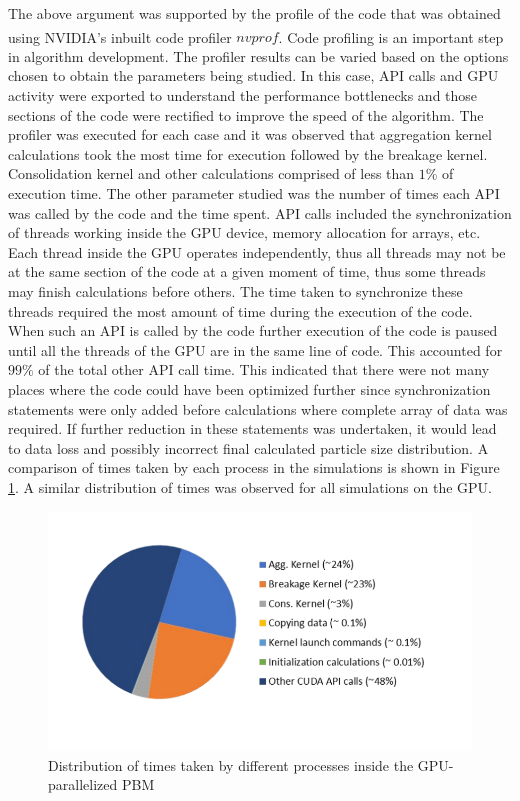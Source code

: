 \documentclass[review]{elsarticle}
\begin{document}
\begin{linenumbers}
The above argument was supported by the profile of the code that was obtained using NVIDIA\textsuperscript{\tiny\textregistered}'s
inbuilt code profiler $nvprof$. Code profiling is an important step in algorithm development. 
The profiler results can be varied based on the options chosen to obtain the parameters being 
studied. In this case, API calls and GPU activity were exported to understand the performance 
bottlenecks and those sections of the code were rectified to improve the speed of the algorithm.
The profiler was executed for each case and it was observed that aggregation kernel calculations 
took the most time for execution followed by the breakage kernel. Consolidation kernel 
and other calculations comprised of less than $1$\% of execution time. The other parameter 
studied was the number of times each API was called by the code and the time spent. API 
calls included the synchronization of threads working inside the GPU device, memory allocation 
for arrays, etc. Each thread inside the GPU operates independently,
thus all threads may not be at the same section of the code at a given moment of time, 
thus some threads may finish calculations before others. The time taken to synchronize 
these threads required the most amount of time during the execution of the code. When 
such an API is called by the code further execution of the code is paused until all 
the threads of the GPU are in the same line of code. This accounted for $99\%$ of the total  
other API call time. This indicated that there were not many places where the code could 
have been optimized further since synchronization statements were only added before 
calculations where complete array of data was required. 
If further reduction in these statements was undertaken, it would lead to data loss and 
possibly incorrect final calculated particle size distribution. A comparison of times taken 
by each process in the simulations is shown in Figure \ref{fig:res_profile_pie}. A similar 
distribution of times was observed for all simulations on the GPU.

\begin{figure}[H]
\centering
\includegraphics[scale=1]{Figure_5.pdf}
\caption{Distribution of times taken by different processes inside the GPU-parallelized 
PBM}
\label{fig:res_profile_pie}
\end{figure}



\end{linenumbers}
\end{document}
